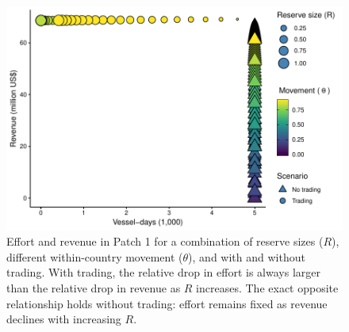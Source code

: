 \documentclass[12pt]{article}
\begin{document}
\begin{figure}
	\centering
	\includegraphics{img/effort_and_revenues.pdf}
	\caption{\label{fig:effort_and_revenues}Effort and revenue in Patch 1 for a combination of reserve sizes ($R$), different within-country movement ($\theta$), and with and without trading. With trading, the relative drop in effort is always larger than the relative drop in revenue as $R$ increases. The exact opposite relationship holds without trading: effort remains fixed as revenue declines with increasing $R$.}
\end{figure}
\end{document}
